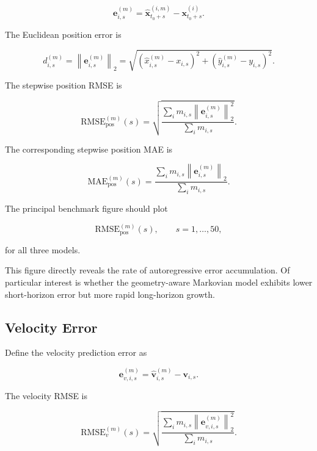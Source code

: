 \documentclass[11pt]{article}
\newcommand{\x}{\mathbf{x}}
\newcommand{\vct}{\mathbf{v}}
\begin{document}
\begin{equation}
\mathbf{e}_{i,s}^{(m)}
=
\hat{\x}_{t_0+s}^{(i,m)}
-
\x_{t_0+s}^{(i)}.
\end{equation}

The Euclidean position error is

\begin{equation}
d_{i,s}^{(m)}
=
\left\|
\mathbf{e}_{i,s}^{(m)}
\right\|_2
=
\sqrt{
\left(
\hat{x}_{i,s}^{(m)}-x_{i,s}
\right)^2
+
\left(
\hat{y}_{i,s}^{(m)}-y_{i,s}
\right)^2
}.
\end{equation}

The stepwise position RMSE is

\begin{equation}
\mathrm{RMSE}_{\mathrm{pos}}^{(m)}(s)
=
\sqrt{
\frac{
\sum_i m_{i,s}
\left\|
\mathbf{e}_{i,s}^{(m)}
\right\|_2^2
}{
\sum_i m_{i,s}
}
}.
\end{equation}

The corresponding stepwise position MAE is

\begin{equation}
\mathrm{MAE}_{\mathrm{pos}}^{(m)}(s)
=
\frac{
\sum_i m_{i,s}
\left\|
\mathbf{e}_{i,s}^{(m)}
\right\|_2
}{
\sum_i m_{i,s}
}.
\end{equation}

The principal benchmark figure should plot

\begin{equation}
\mathrm{RMSE}_{\mathrm{pos}}^{(m)}(s),
\qquad
s=1,\ldots,50,
\end{equation}

for all three models.

This figure directly reveals the rate of autoregressive error accumulation. Of particular interest is whether the geometry-aware Markovian model exhibits lower short-horizon error but more rapid long-horizon growth.

\subsection{Velocity Error}

Define the velocity prediction error as

\begin{equation}
\mathbf{e}_{v,i,s}^{(m)}
=
\hat{\vct}_{i,s}^{(m)}
-
\vct_{i,s}.
\end{equation}

The velocity RMSE is

\begin{equation}
\mathrm{RMSE}_{v}^{(m)}(s)
=
\sqrt{
\frac{
\sum_i m_{i,s}
\left\|
\mathbf{e}_{v,i,s}^{(m)}
\right\|_2^2
}{
\sum_i m_{i,s}
}
}.
\end{equation}
\end{document}
